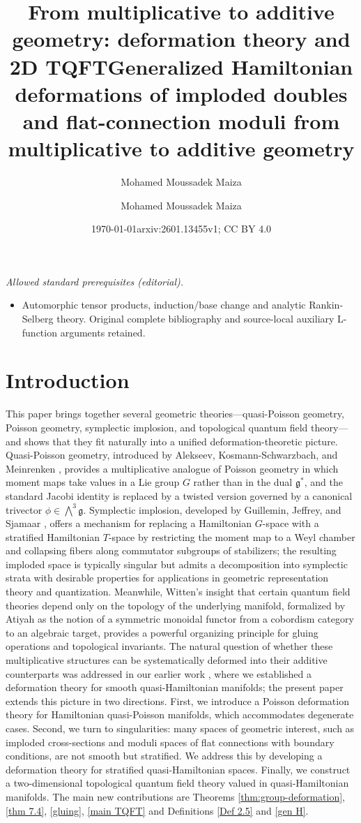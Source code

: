 \documentclass[reqno]{amsart}
\title{From multiplicative to additive geometry: deformation theory and 2D TQFT}
\date{\today}
\author{Mohamed Moussadek Maiza}
\title{Generalized Hamiltonian deformations of imploded doubles and flat-connection moduli from multiplicative to additive geometry}
\author{Mohamed Moussadek Maiza}
\date{arxiv:2601.13455v1; CC BY 4.0}
\theoremstyle{plain}
\theoremstyle{definition}
\newcommand{\g}{\mathfrak{g}}
\begin{document}
\maketitle
\noindent\textit{Allowed standard prerequisites (editorial).}\begin{itemize}
\item Automorphic tensor products, induction/base change and analytic Rankin-Selberg theory. Original complete bibliography and source-local auxiliary L-function arguments retained.
\end{itemize}\medskip
\section{Introduction}

This paper brings together several geometric theories---quasi-Poisson geometry, Poisson geometry, symplectic implosion, and topological quantum field theory---and shows that they fit naturally into a unified deformation-theoretic picture. Quasi-Poisson geometry, introduced by Alekseev, Kosmann-Schwarzbach, and Meinrenken \cite{alekseev2002quasi}, provides a multiplicative analogue of Poisson geometry in which moment maps take values in a Lie group $G$ rather than in the dual $\g^*$, and the standard Jacobi identity is replaced by a twisted version governed by a canonical trivector $\phi \in \bigwedge^3 \g$. Symplectic implosion, developed by Guillemin, Jeffrey, and Sjamaar \cite{guillemin2002}, offers a mechanism for replacing a Hamiltonian $G$-space with a stratified Hamiltonian $T$-space by restricting the moment map to a Weyl chamber and collapsing fibers along commutator subgroups of stabilizers; the resulting imploded space is typically singular but admits a decomposition into symplectic strata with desirable properties for applications in geometric representation theory and quantization. Meanwhile, Witten's insight \cite{witten1988} that certain quantum field theories depend only on the topology of the underlying manifold, formalized by Atiyah \cite{atiyah1988} as the notion of a symmetric monoidal functor from a cobordism category to an algebraic target, provides a powerful organizing principle for gluing operations and topological invariants. The natural question of whether these multiplicative structures can be systematically deformed into their additive counterparts was addressed in our earlier work \cite{JMM2025deformations}, where we established a deformation theory for smooth quasi-Hamiltonian manifolds; the present paper extends this picture in two directions. First, we introduce a Poisson deformation theory for Hamiltonian quasi-Poisson manifolds, which accommodates degenerate cases. Second, we turn to singularities: many spaces of geometric interest, such as imploded cross-sections and moduli spaces of flat connections with boundary conditions, are not smooth but stratified. We address this by developing a deformation theory for stratified quasi-Hamiltonian spaces. Finally, we construct a two-dimensional topological quantum field theory valued in quasi-Hamiltonian manifolds. The main new contributions are Theorems \ref{thm:group-deformation}, \ref{thm 7.4}, \ref{gluing}, \ref{main TQFT} and Definitions \ref{Def 2.5} and \ref{gen H}.
\end{document}
